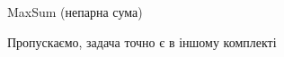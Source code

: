 ﻿\begin{problemAllDefault}{MaxSum (непарна сума)}\label{problem:maxsum-odd}

Пропускаємо, задача точно є в іншому комплекті

\end{problemAllDefault}
 
 